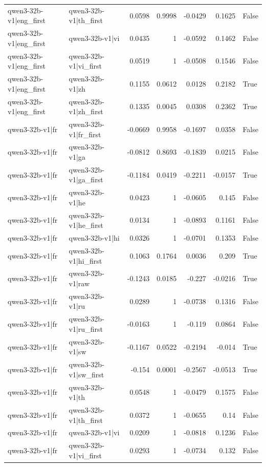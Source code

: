 \begin{table}
\begin{tabular}{l l r r r r l}
qwen3-32b-v1|eng_first & qwen3-32b-v1|th_first & 0.0598 & 0.9998 & -0.0429 & 0.1625 & False \\
qwen3-32b-v1|eng_first & qwen3-32b-v1|vi & 0.0435 & 1 & -0.0592 & 0.1462 & False \\
qwen3-32b-v1|eng_first & qwen3-32b-v1|vi_first & 0.0519 & 1 & -0.0508 & 0.1546 & False \\
qwen3-32b-v1|eng_first & qwen3-32b-v1|zh & 0.1155 & 0.0612 & 0.0128 & 0.2182 & True \\
qwen3-32b-v1|eng_first & qwen3-32b-v1|zh_first & 0.1335 & 0.0045 & 0.0308 & 0.2362 & True \\
qwen3-32b-v1|fr & qwen3-32b-v1|fr_first & -0.0669 & 0.9958 & -0.1697 & 0.0358 & False \\
qwen3-32b-v1|fr & qwen3-32b-v1|ga & -0.0812 & 0.8693 & -0.1839 & 0.0215 & False \\
qwen3-32b-v1|fr & qwen3-32b-v1|ga_first & -0.1184 & 0.0419 & -0.2211 & -0.0157 & True \\
qwen3-32b-v1|fr & qwen3-32b-v1|he & 0.0423 & 1 & -0.0605 & 0.145 & False \\
qwen3-32b-v1|fr & qwen3-32b-v1|he_first & 0.0134 & 1 & -0.0893 & 0.1161 & False \\
qwen3-32b-v1|fr & qwen3-32b-v1|hi & 0.0326 & 1 & -0.0701 & 0.1353 & False \\
qwen3-32b-v1|fr & qwen3-32b-v1|hi_first & 0.1063 & 0.1764 & 0.0036 & 0.209 & True \\
qwen3-32b-v1|fr & qwen3-32b-v1|raw & -0.1243 & 0.0185 & -0.227 & -0.0216 & True \\
qwen3-32b-v1|fr & qwen3-32b-v1|ru & 0.0289 & 1 & -0.0738 & 0.1316 & False \\
qwen3-32b-v1|fr & qwen3-32b-v1|ru_first & -0.0163 & 1 & -0.119 & 0.0864 & False \\
qwen3-32b-v1|fr & qwen3-32b-v1|sw & -0.1167 & 0.0522 & -0.2194 & -0.014 & True \\
qwen3-32b-v1|fr & qwen3-32b-v1|sw_first & -0.154 & 0.0001 & -0.2567 & -0.0513 & True \\
qwen3-32b-v1|fr & qwen3-32b-v1|th & 0.0548 & 1 & -0.0479 & 0.1575 & False \\
qwen3-32b-v1|fr & qwen3-32b-v1|th_first & 0.0372 & 1 & -0.0655 & 0.14 & False \\
qwen3-32b-v1|fr & qwen3-32b-v1|vi & 0.0209 & 1 & -0.0818 & 0.1236 & False \\
qwen3-32b-v1|fr & qwen3-32b-v1|vi_first & 0.0293 & 1 & -0.0734 & 0.132 & False \\

\end{tabular}
\end{table}
